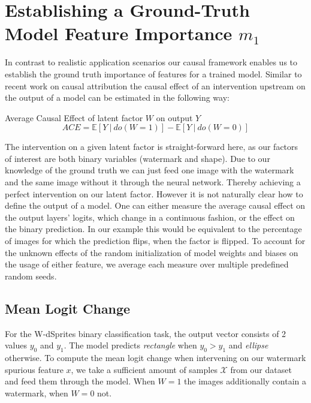 \section{Establishing a Ground-Truth Model Feature Importance $m_1$}\label{section:gt_measure}
In contrast to realistic application scenarios our causal framework enables us to establish the ground truth importance of features for a trained model. Similar to recent work on causal attribution \cite{Parafita2019,Reimers2020,Karimi2023} the causal effect of an intervention upstream on the output of a model can be estimated in the following way:
\begin{center}
Average Causal Effect of latent factor $W$ on output $Y$ \\
\begin{equation}
\displaystyle ACE = \mathbb{E} [ Y \ | \ do(W=1) ] - \mathbb{E} [ Y \ | \ do(W=0) ] 
\end{equation}
\end{center}
The intervention on a given latent factor is straight-forward here, as our factors of interest are both binary variables (watermark and shape). Due to our knowledge of the ground truth we can just feed one image with the watermark and the same image without it through the neural network. Thereby achieving a perfect intervention on our latent factor.  
However it is not naturally clear how to define the output of a model. One can either measure the average causal effect on the output layers' logits, which change in a continuous fashion, or the effect on the binary prediction. In our example this would be equivalent to the percentage of images for which the prediction flips, when the factor is flipped. 
To account for the unknown effects of the random initialization of model weights and biases on the usage of either feature, we average each measure over multiple predefined random seeds. 

\subsection{Mean Logit Change}
For the W-dSprites binary classification task, the output vector consists of 2 values $y_0$ and $y_1$. The model predicts \textit{rectangle} when $y_0 > y_1$ and \textit{ellipse} otherwise. To compute the mean logit change when intervening on our watermark spurious feature $x$, we take a sufficient amount of samples $\mathcal{X}$ from our dataset and feed them through the model. When $W=1$ the images additionally contain a watermark, when $W=0$ not. 

